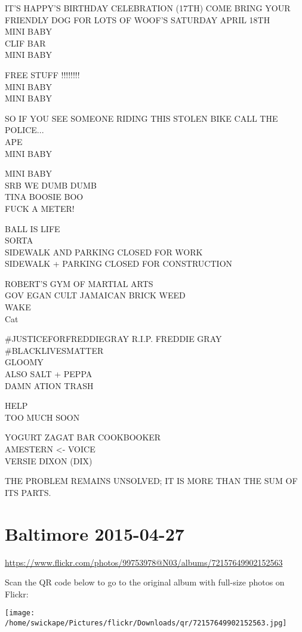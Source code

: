 \documentclass[10pt,letterpaper]{article}
\begin{document}
IT'S HAPPY'S BIRTHDAY CELEBRATION (17TH) COME BRING YOUR FRIENDLY DOG FOR LOTS OF WOOF'S SATURDAY APRIL 18TH\\
MINI BABY\\
CLIF BAR\\
MINI BABY

FREE STUFF !!!!!!!!\\
MINI BABY\\
MINI BABY

SO IF YOU SEE SOMEONE RIDING THIS STOLEN BIKE CALL THE POLICE...\\
APE\\
MINI BABY

MINI BABY\\
SRB WE DUMB DUMB\\
TINA BOOSIE BOO\\
FUCK A METER!

BALL IS LIFE\\
SORTA\\
SIDEWALK AND PARKING CLOSED FOR WORK\\
SIDEWALK + PARKING CLOSED FOR CONSTRUCTION

ROBERT'S GYM OF MARTIAL ARTS\\
GOV EGAN CULT JAMAICAN BRICK WEED\\
WAKE\\
Cat

\#JUSTICEFORFREDDIEGRAY R.I.P. FREDDIE GRAY \#BLACKLIVESMATTER\\
GLOOMY\\
ALSO SALT + PEPPA\\
DAMN ATION TRASH

HELP\\
TOO MUCH SOON

YOGURT ZAGAT BAR COOKBOOKER\\
AMESTERN <{-} VOICE\\
VERSIE DIXON (DIX)

THE PROBLEM REMAINS UNSOLVED; IT IS MORE THAN THE SUM OF ITS PARTS.


\section*{Baltimore 2015-04-27}

\url{https://www.flickr.com/photos/99753978@N03/albums/72157649902152563}

Scan the QR code below to go to the original album with full-size photos on Flickr:

\texttt{[image: /home/swickape/Pictures/flickr/Downloads/qr/72157649902152563.jpg]}
\end{document}
